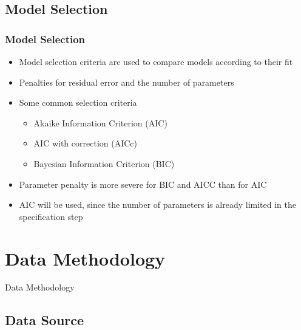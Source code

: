 \documentclass[presentation]{beamer}
\begin{document}
\subsection{Model Selection}

\begin{frame}[t]
\frametitle{Model Selection}
\begin{itemize}
\item{Model selection criteria are used to compare models according to their fit}
\item{Penalties for residual error and the number of parameters}
\item{Some common selection criteria
  \begin{itemize}
  \item{Akaike Information Criterion (AIC)}
  \item{AIC with correction (AICc)}
  \item{Bayesian Information Criterion (BIC)}
  \end{itemize}
}
\item{Parameter penalty is more severe for BIC and AICC than for AIC \cite{bisgaard2011time}}
\item{AIC will be used, since the number of parameters is already limited in the specification step}
\end{itemize}
\end{frame}

\section{Data Methodology}

\begin{frame}
\begin{center}
\Large{Data Methodology}
\end{center}
\end{frame}


\subsection{Data Source}
\end{document}
